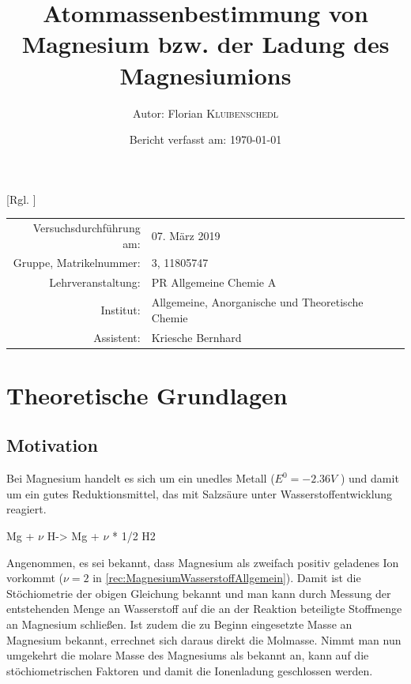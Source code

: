 \documentclass{article}
\title{Atommassenbestimmung von Magnesium bzw. der Ladung des Magnesiumions \cite{Versuchsvorschrift}} %
\author{Autor: Florian \textsc{Kluibenschedl}} %
\date{Bericht verfasst am: \today} %
\begin{document}
  [Rgl. ]{}{}
  
  \maketitle %
  
  \begin{center}
    \begin{tabular}{r p{4cm}}
      Versuchsdurchführung am: & 07. März 2019\\ %
      Gruppe, Matrikelnummer: & 3, 11805747 \\
      Lehrveranstaltung: & PR Allgemeine Chemie A \\
      Institut: & Allgemeine, Anorganische und Theoretische Chemie \\
      Assistent: & Kriesche Bernhard %
    \end{tabular}
  \end{center}


  \begin{abstract}
    
  \end{abstract}
  
  \pagebreak 
  
  \section{Theoretische Grundlagen}
  
    \subsection{Motivation} \label{sec:Motivation}
  Bei Magnesium handelt es sich um ein unedles Metall ($E^{0} = -2.36 V$ \cite[S. 881]{PhysicalChemistryAtkings}) und damit um ein gutes Reduktionsmittel, das mit Salzsäure unter Wasserstoffentwicklung reagiert.   

  \begin{reaction}
    Mg\sld{} + $\nu$ H\pch\aq -> Mg\pch[$\nu$] \aq{} + $\nu$ * 1/2 H2\gas{} \label{rec:MagnesiumWasserstoffAllgemein}
  \end{reaction}
  
  Angenommen, es sei bekannt, dass Magnesium als zweifach positiv geladenes Ion vorkommt ($\nu = 2$ in \ref{rec:MagnesiumWasserstoffAllgemein}). Damit ist die Stöchiometrie der obigen Gleichung bekannt und man kann durch Messung der entstehenden Menge an Wasserstoff auf die an der Reaktion beteiligte Stoffmenge an Magnesium schließen. Ist zudem die zu Beginn eingesetzte Masse an Magnesium bekannt, errechnet sich daraus direkt die Molmasse. Nimmt man nun umgekehrt die molare Masse des Magnesiums als bekannt an, kann auf die stöchiometrischen Faktoren und damit die Ionenladung geschlossen werden. 
  
\end{document}
